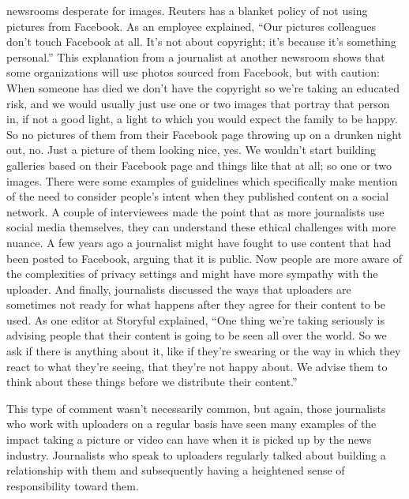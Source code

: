 \documentclass[symmetric, notoc, nobib]{towcenter-book}
\begin{document}
newsrooms desperate for images. Reuters has a blanket policy of not using
pictures from Facebook. As an employee explained, ``Our pictures colleagues
don't touch Facebook at all. It's not about copyright; it's because it's
something personal.''
This explanation from a journalist at another newsroom shows that some
organizations will use photos sourced from Facebook, but with caution:
When someone has died we don't have the copyright so we're taking
an educated risk, and we would usually just use one or two images
that portray that person in, if not a good light, a light to which you
would expect the family to be happy. So no pictures of them from
their Facebook page throwing up on a drunken night out, no. Just a
picture of them looking nice, yes. We wouldn't start building galleries
based on their Facebook page and things like that at all; so one or
two images.
There were some examples of guidelines which specifically make mention
of the need to consider people's intent when they published content on a
social network. A couple of interviewees made the point that as more journalists
use social media themselves, they can understand these ethical challenges
with more nuance. A few years ago a journalist might have fought to
use content that had been posted to Facebook, arguing that it is public. Now
people are more aware of the complexities of privacy settings and might
have more sympathy with the uploader.
And finally, journalists discussed the ways that uploaders are sometimes not
ready for what happens after they agree for their content to be used. As one
editor at Storyful explained, ``One thing we're taking seriously is advising
people that their content is going to be seen all over the world. So we ask if
there is anything about it, like if they're swearing or the way in which they
react to what they're seeing, that they're not happy about. We advise them
to think about these things before we distribute their content.''

This type of comment wasn't necessarily common, but again, those journalists
who work with uploaders on a regular basis have seen many examples
of the impact taking a picture or video can have when it is picked up by the
news industry. Journalists who speak to uploaders regularly talked about
building a relationship with them and subsequently having a heightened
sense of responsibility toward them.
\end{document}
